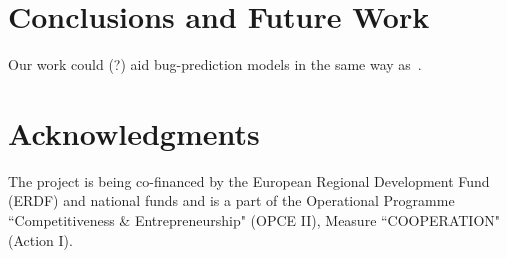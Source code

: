 \documentclass[conference]{IEEEtran}
\begin{document}
\section{Conclusions and Future Work}
\label{sec:con}

Our work could (?) aid bug-prediction models in the same way as~\cite{BN11}.

\section*{Acknowledgments}

The project is being co-financed by the European Regional Development Fund (ERDF)
and national funds and is a part of the Operational Programme ``Competitiveness \&
Entrepreneurship" (OPCE II), Measure ``COOPERATION" (Action I).


 
\end{document}
